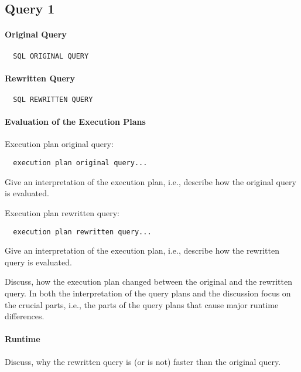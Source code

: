 \documentclass[11pt]{scrartcl}
\begin{document}
\subsection*{Query 1}

\paragraph{Original Query}

{\small
\begin{verbatim}
  SQL ORIGINAL QUERY
\end{verbatim}
}

\paragraph{Rewritten Query}

{\small
\begin{verbatim}
  SQL REWRITTEN QUERY
\end{verbatim}
}

\paragraph{Evaluation of the Execution Plans}

Execution plan original query:

\begin{verbatim}
  execution plan original query...
\end{verbatim}

Give an interpretation of the execution plan, i.e., describe how the
original query is evaluated.

Execution plan rewritten query:

\begin{verbatim}
  execution plan rewritten query...
\end{verbatim}

Give an interpretation of the execution plan, i.e., describe how the
rewritten query is evaluated.

Discuss, how the execution plan changed between the original and the
rewritten query. In both the interpretation of the query plans and the
discussion focus on the crucial parts, i.e., the parts of the query
plans that cause major runtime differences.

\paragraph{Runtime} Discuss, why the rewritten query is (or is not)
faster than the original query.
\end{document}
